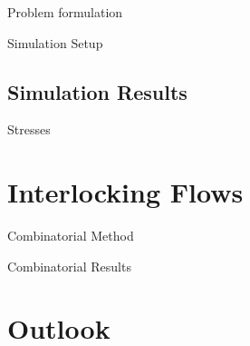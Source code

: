 \documentclass{beamer}
\numberwithin{equation}{aufgabe}
\begin{document}
\begin{frame}{Problem formulation}

\end{frame}

\begin{frame}{Simulation Setup}
    
\end{frame}

\subsection{Simulation Results}
\begin{frame}{Stresses}
    
\end{frame}

\section{Interlocking Flows}
\begin{frame}{Combinatorial Method}
    
\end{frame}

\begin{frame}{Combinatorial Results}
    
\end{frame}

\section{Outlook}

\begin{frame}
    
\end{frame}

\appendix
\begin{frame}    
\printbibliography 
\end{frame}
\end{document}

